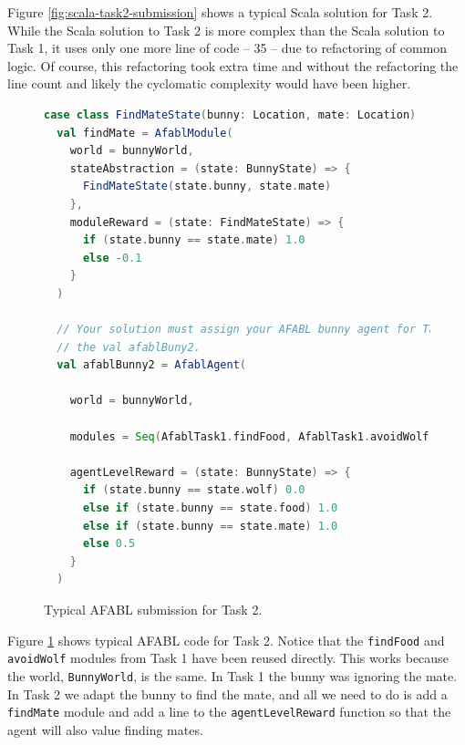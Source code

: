 Figure \ref{fig:scala-task2-submission} shows a typical Scala solution for Task 2. While the Scala solution to Task 2 is more complex than the Scala solution to Task 1, it uses only one more line of code -- 35 -- due to refactoring of common logic. Of course, this refactoring took extra time and without the refactoring the line count and likely the cyclomatic complexity would have been higher.

\begin{figure}[!h]
\begin{center}

\begin{lstlisting}[language=Scala]
  case class FindMateState(bunny: Location, mate: Location)
  val findMate = AfablModule(
    world = bunnyWorld,
    stateAbstraction = (state: BunnyState) => {
      FindMateState(state.bunny, state.mate)
    },
    moduleReward = (state: FindMateState) => {
      if (state.bunny == state.mate) 1.0
      else -0.1
    }
  )

  // Your solution must assign your AFABL bunny agent for Task 2 to
  // the val afablBuny2.
  val afablBunny2 = AfablAgent(

    world = bunnyWorld,

    modules = Seq(AfablTask1.findFood, AfablTask1.avoidWolf, findMate),

    agentLevelReward = (state: BunnyState) => {
      if (state.bunny == state.wolf) 0.0
      else if (state.bunny == state.food) 1.0
      else if (state.bunny == state.mate) 1.0
      else 0.5
    }
  )
\end{lstlisting}

\caption{Typical AFABL submission for Task 2.}
\end{center}
\label{fig:afabl-task2-submission}
\end{figure}

Figure \ref{fig:afabl-task2-submission} shows typical AFABL code for Task 2. Notice that the {\tt findFood} and {\tt avoidWolf} modules from Task 1 have been reused directly. This works because the world, {\tt BunnyWorld}, is the same. In Task 1 the bunny was ignoring the mate. In Task 2 we adapt the bunny to find the mate, and all we need to do is add a {\tt findMate} module and add a line to the {\tt agentLevelReward} function so that the agent will also value finding mates.

